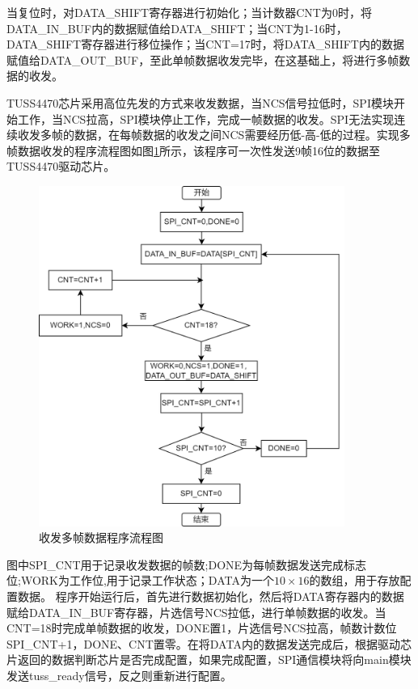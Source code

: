 当复位时，对DATA\_SHIFT寄存器进行初始化；当计数器CNT为0时，将DATA\_IN\_BUF内的数据赋值给DATA\_SHIFT；当CNT为1-16时，DATA\_SHIFT寄存器进行移位操作；当CNT=17时，将DATA\_SHIFT内的数据赋值给DATA\_OUT\_BUF，至此单帧数据收发完毕，在这基础上，将进行多帧数据的收发。




TUSS4470芯片采用高位先发的方式来收发数据，当NCS信号拉低时，SPI模块开始工作，当NCS拉高，SPI模块停止工作，完成一帧数据的收发。SPI无法实现连续收发多帧的数据，在每帧数据的收发之间NCS需要经历低-高-低的过程。实现多帧数据收发的程序流程图如图\ref{收发多帧数据程序流程图}所示，该程序可一次性发送9帧16位的数据至TUSS4470驱动芯片。
\begin{figure}[ht]
	\centering
	\includegraphics[width=10cm]{figure/SPI Program Flow Chart.png}
	\caption{收发多帧数据程序流程图}
	\label{收发多帧数据程序流程图}
\end{figure} 
图中SPI\_CNT用于记录收发数据的帧数;DONE为每帧数据发送完成标志位;WORK为工作位,用于记录工作状态；DATA为一个$10\times16$的数组，用于存放配置数据。
程序开始运行后，首先进行数据初始化，然后将DATA寄存器内的数据赋给DATA\_IN\_BUF寄存器，片选信号NCS拉低，进行单帧数据的收发。当CNT=18时完成单帧数据的收发，DONE置1，片选信号NCS拉高，帧数计数位SPI\_CNT+1，DONE、CNT置零。在将DATA内的数据发送完成后，根据驱动芯片返回的数据判断芯片是否完成配置，如果完成配置，SPI通信模块将向main模块发送tuss\_ready信号，反之则重新进行配置。





\noindent

